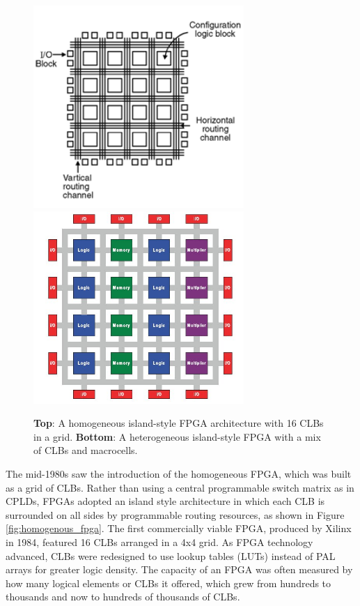 \documentclass[twocolumn]{article}
\begin{document}
    \begin{figure}
        \centering
        \includegraphics[width=8.0cm]{figures/homogenous_fpga.png}
        \includegraphics[width=8.0cm]{figures/heterogenous_fpga_3.jpg}
        \caption{
            \textbf{Top}: A homogeneous island-style FPGA architecture with 16 CLBs in a grid. 
            \textbf{Bottom}: A heterogeneous island-style FPGA with a mix of CLBs and macrocells.
        }
        \label{fig:fpga}
    \end{figure}

    The mid-1980s saw the introduction of the homogeneous FPGA, which was built as a grid of CLBs. 
    Rather than using a central programmable switch matrix as in CPLDs, FPGAs adopted an island style architecture in which each CLB is surrounded on all sides by programmable routing resources, as shown in Figure \ref{fig:homogenous_fpga}. 
    The first commercially viable FPGA, produced by Xilinx in 1984, featured 16 CLBs arranged in a 4x4 grid. 
    As FPGA technology advanced, CLBs were redesigned to use lookup tables (LUTs) instead of PAL arrays for greater logic density. 
    The capacity of an FPGA was often measured by how many logical elements or CLBs it offered, which grew from hundreds to thousands and now to hundreds of thousands of CLBs.
\end{document}
